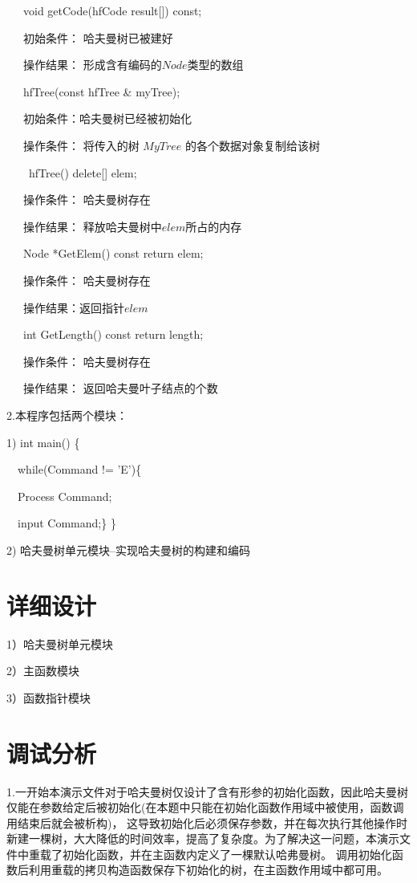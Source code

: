 \documentclass[paper=a4,UTF8,fontsize=11pt]{scrartcl} %
\numberwithin{equation}{section} %
\numberwithin{figure}{section} %
\numberwithin{table}{section} %
\begin{document}
\qquad \qquad \quad \ \ \ void getCode(hfCode result[]) const;

\qquad \qquad \quad \ \ \ 初始条件： 哈夫曼树已被建好

\qquad \qquad \quad \ \ \ 操作结果： 形成含有编码的$Node$类型的数组

\qquad \qquad \quad \ \ \ hfTree(const hfTree \& myTree);

\qquad \qquad \quad \ \ \ 初始条件：哈夫曼树已经被初始化

\qquad \qquad \quad \ \ \ 操作条件： 将传入的树 $MyTree$ 的各个数据对象复制给该树

\qquad \qquad \quad \ \ \  ~hfTree() { delete[] elem; }

\qquad \qquad \quad \ \ \  操作条件： 哈夫曼树存在

\qquad \qquad \quad \ \ \ 操作结果： 释放哈夫曼树中$elem$所占的内存

\qquad \qquad \quad \ \ \ Node *GetElem() const { return elem; }

\qquad \qquad \quad \ \ \ 操作条件： 哈夫曼树存在

\qquad \qquad \quad \ \ \ 操作结果：返回指针$elem$

\qquad \qquad \quad \ \ \ int GetLength() const { return length; }

\qquad \qquad \quad \ \ \ 操作条件： 哈夫曼树存在

\qquad \qquad \quad \ \ \ 操作结果： 返回哈夫曼叶子结点的个数
\vspace{0.3cm}

2.本程序包括两个模块：

1)  int main() \{

    \ \  while(Command != 'E')\{

        \ \  Process Command;

        \ \  input Command;\} \}
       
2)  哈夫曼树单元模块--实现哈夫曼树的构建和编码

\section{详细设计}
1）哈夫曼树单元模块


2）主函数模块


3）函数指针模块

\vspace{0.3cm}
\section{调试分析}
1.一开始本演示文件对于哈夫曼树仅设计了含有形参的初始化函数，因此哈夫曼树仅能在参数给定后被初始化(在本题中只能在初始化函数作用域中被使用，函数调用结束后就会被析构)，
这导致初始化后必须保存参数，并在每次执行其他操作时新建一棵树，大大降低的时间效率，提高了复杂度。为了解决这一问题，本演示文件中重载了初始化函数，并在主函数内定义了一棵默认哈弗曼树。
调用初始化函数后利用重载的拷贝构造函数保存下初始化的树，在主函数作用域中都可用。
\end{document}
